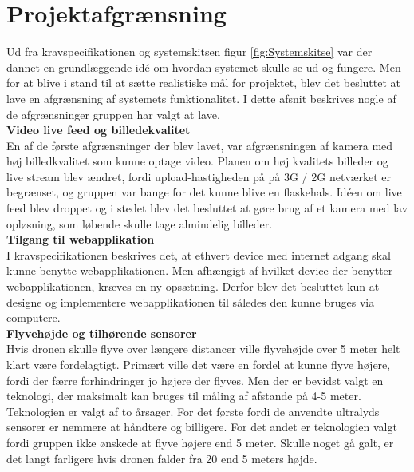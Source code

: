 \chapter{Projektafgrænsning}

Ud fra kravspecifikationen og systemskitsen figur \ref{fig:Systemskitse} var der dannet en grundlæggende idé om hvordan systemet skulle se ud og fungere. Men for at blive i stand til at sætte realistiske mål for projektet, blev det besluttet at lave en afgrænsning af systemets funktionalitet. I dette afsnit beskrives nogle af de afgrænsninger gruppen har valgt at lave. \\


\textbf{Video live feed og billedekvalitet}\\
En af de første afgrænsninger der blev lavet, var afgrænsningen af kamera med høj billedkvalitet som kunne optage video. Planen om høj kvalitets billeder og live stream blev ændret, fordi upload-hastigheden på på 3G / 2G netværket er begrænset, og gruppen var bange for det kunne blive en flaskehals. Idéen om live feed blev droppet og i stedet blev det besluttet at gøre brug af et kamera med lav opløsning, som løbende skulle tage almindelig billeder.\\

\textbf{Tilgang til webapplikation}\\
I kravspecifikationen beskrives det, at ethvert device med internet adgang skal kunne benytte webapplikationen. Men afhængigt af hvilket device der benytter webapplikationen, kræves en ny opsætning. Derfor blev det besluttet kun at designe og implementere webapplikationen til således den kunne bruges via computere.\\

\textbf{Flyvehøjde og tilhørende sensorer}\\
Hvis dronen skulle flyve over længere distancer ville flyvehøjde over 5 meter helt klart være fordelagtigt. Primært ville det være en fordel at kunne flyve højere, fordi der færre forhindringer jo højere der flyves. Men der er bevidst valgt en teknologi, der maksimalt kan bruges til måling af afstande på 4-5 meter. Teknologien er valgt af to årsager. For det første fordi de anvendte ultralyds sensorer er nemmere at håndtere og billigere. For det andet er teknologien valgt fordi gruppen ikke ønskede at flyve højere end 5 meter. Skulle noget gå galt, er det langt farligere hvis dronen falder fra 20 end 5 meters højde.  
